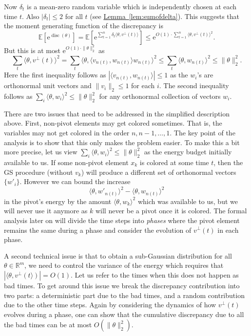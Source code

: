 \documentclass[11pt]{article}
\numberwithin{equation}{section}
\theoremstyle{definition}
\theoremstyle{plain}
\newcommand{\eee}{\mathrm e}
\newcommand{\expref}[2]{\hyperref[#2]{#1~\ref{#2}}}
\newcommand\E{\mathbb{E}}
\DeclareMathOperator{\disc}{disc}   %
\begin{document}
Now $\delta_t$ is a mean-zero random variable which is independently chosen at each time $t$. Also $|\delta_t|\leq 2$ for all $t$ (see \expref{Lemma}{lem:sumofdelta}). This suggests that the moment generating function of the discrepancy is
\[
\E\left[\eee^{\disc(\theta)}\right]  = \E\left[\eee^{ \sum_{t=1}^n  \delta_t \langle  \theta, v^{\perp}(t)\rangle  }\right]
\le  \eee^{O(1) \cdot \sum_{t=1}^n \langle \theta, v^{\perp}(t) \rangle^2}.
\]
But this is at most $ \eee^{O(1) \cdot \| \theta\|_2^2}$ as
\[ \sum_t \langle \theta, v^{\perp}(t) \rangle^2  = \sum_t \langle  \theta,  \langle v_{n(t)},w_{n(t)} \rangle w_{n(t)} \rangle^2 \leq  \sum_t \langle  \theta, w_{n(t)} \rangle^2 \leq \| \theta\|_2^2.\]
Here the first inequality follows as $|\langle v_{n(t)},w_{n(t)} \rangle|\leq 1$ as the $w_i$'s are orthonormal unit vectors and $\|v_i\|_2 \leq 1$ for each $i$.
The second inequality follows as $\sum_i \langle  \theta, w_{i} \rangle^2 \leq \|\theta\|^2_2$ for any orthonormal collection of vectors $w_i$.

There are two issues that need to be addressed in the simplified description above.
First, non-pivot elements may get colored sometimes. That is, the variables may not get colored in the order $n,n-1,\ldots,1$. The key point of the analysis is to show that this only makes the problem easier. To make this a bit more precise, let us view
$\sum_i \langle  \theta, w_{i} \rangle^2 \leq \|\theta\|^2_2$  as the energy budget initially available to us. If some non-pivot element $x_k$ is colored at some time $t$, then the GS procedure (without $v_k$) will produce a different set of orthonormal vectors $\{w'_i\}$. However we can bound the increase
\[\langle \theta,w'_{n(t)} \rangle^2 - \langle \theta,w_{n(t)} \rangle^2 \]
 in the pivot's energy by the amount  $\langle  \theta, w_{k} \rangle^2$ which
was available to us, but we will never use it anymore as $k$ will never be a pivot once it is colored.
The formal analysis later on will divide the time steps into \textit{phases} where the pivot element remains the same during a phase and consider the evolution of $v^{\perp}(t)$ in each phase.

A second technical issue is that to obtain a sub-Gaussian distribution for all $\theta \in \mathbb{R}^m$, we need to control the variance of the energy which requires that $|\langle \theta, v^{\perp}(t \rangle)|=O(1)$. Let us refer to the times when this does not happen as bad times. To get around this issue we break the discrepancy contribution into two parts: a deterministic part due to the bad times, and a random contribution due to the other time steps. Again by considering the dynamics of how $v^{\perp}(t)$ evolves during a phase, one can show that the cumulative discrepancy due to all the bad times can be at most $O(\| \theta\|_2^2)$.
\end{document}
